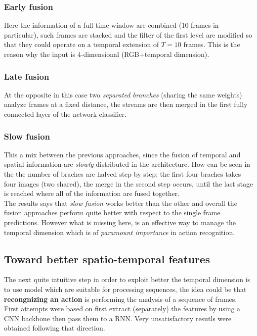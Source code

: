 \subsubsection{Early fusion}
Here the information of a full time-window are combined (10 frames in particular), such frames are stacked and the filter of the first level are modified so that they could operate on a temporal extension of $T=10$ frames. This is the reason why the input is 4-dimensional (RGB+temporal dimension).
\subsubsection{Late fusion}
At the opposite in this case two \textit{separated branches} (sharing the same weights) analyze frames at a fixed distance, the streams are then merged in the first fully connected layer of the network classifier.

\subsubsection{Slow fusion}
This a mix between the previous approaches, since the fusion of temporal and spatial information are \textit{slowly} distributed in the architecture. How can be seen in the  the number of braches are halved step by step; the first four braches takes four images (two shared), the merge in the second step occurs, until the last stage is reached where all of the information are fused together.\\

\noindent
The results says that \textit{slow fusion} works better than the other and overall the fusion approaches perform quite better with respect to the single frame predictions. However what is missing here, is an effective way to manage the temporal dimension which is of \textit{paramount importance} in action recognition.\\

\subsection*{Toward better spatio-temporal features}
The next quite intuitive step in order to exploit better the temporal dimension is to use model which are suitable for processing sequences, the idea could be that \textbf{recongnizing an action} is performing the analysis of a sequence of frames. First attempts were based on first extract (separately) the features by using a CNN backbone then pass them to a RNN. Very unsatisfactory resutls were obtained following that direction.

